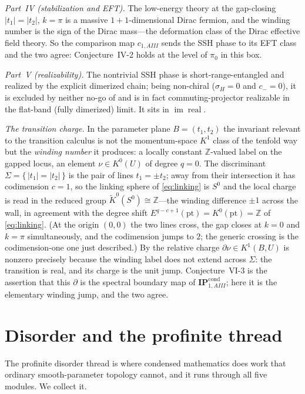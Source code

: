 \documentclass[12pt]{article}
\newcommand{\IPcond}{\mathbf{IP}^{\mathrm{cond}}}  %
\newcommand{\Sig}{\Sigma}                       %
\newcommand{\rc}{\partial\nu}                   %
\newcommand{\ZZ}{\mathbb{Z}}
\newcommand{\real}{\operatorname{real}}        %
\newcommand{\abs}[1]{\lvert #1 \rvert}
\newcommand{\set}[1]{\{\,#1\,\}}
\newcommand{\im}{\operatorname{im}}
\theoremstyle{plain}
\theoremstyle{definition}
\theoremstyle{remark}
\begin{document}
\emph{Part~IV (stabilization and EFT).} The low-energy theory at the gap-closing
$\abs{t_1}=\abs{t_2}$, $k=\pi$ is a massive $1{+}1$-dimensional Dirac fermion, and the
winding number is the sign of the Dirac mass---the deformation class of the Dirac
effective field theory. So the comparison map $c_{1,\mathit{AIII}}$ sends the SSH phase to
its EFT class and the two agree: Conjecture~IV-2 holds at the level of $\pi_0$ in this
box.

\emph{Part~V (realizability).} The nontrivial SSH phase is short-range-entangled and
realized by the explicit dimerized chain; being non-chiral ($\sigma_H=0$ and $c_-=0$), it is
excluded by neither no-go of  and is in fact commuting-projector realizable in
the flat-band (fully dimerized) limit. It sits in $\im\real$.

\emph{The transition charge.} In the parameter plane $B=(t_1,t_2)$ the invariant relevant to
the transition calculus is not the momentum-space $K^1$ class of the tenfold way but the
\emph{winding number} it produces: a locally constant $\ZZ$-valued label on the gapped locus,
an element $\nu\in K^0(U)$ of degree $q=0$. The discriminant $\Sig=\set{\abs{t_1}=\abs{t_2}}$
is the pair of lines $t_1=\pm t_2$; away from their intersection it has codimension $c=1$, so
the linking sphere of \eqref{eq:linking} is $S^0$ and the local charge is read in the reduced
group $\widetilde K^0(S^0)\cong\ZZ$---the winding difference $\pm1$ across the wall, in
agreement with the degree shift $E^{q-c+1}(\mathrm{pt})=K^0(\mathrm{pt})=\ZZ$ of
\eqref{eq:linking}. (At the origin $(0,0)$ the two lines cross, the gap closes at $k=0$ and
$k=\pi$ simultaneously, and the codimension jumps to $2$; the generic crossing is the
codimension-one one just described.) By  the relative charge
$\rc\in K^{1}(B,U)$ is nonzero precisely because the winding label does not extend
across $\Sig$: the transition is real, and its charge is the unit jump. Conjecture~VI-3 is the
assertion that this $\partial$ is the spectral boundary map of $\IPcond_{1,\mathit{AIII}}$;
here it is the elementary winding jump, and the two agree.

\section{Disorder and the profinite thread}
\label{sec:disorder}

The profinite disorder thread is where condensed mathematics does work that ordinary
smooth-parameter topology cannot, and it runs through all five modules. We collect it.
\end{document}
